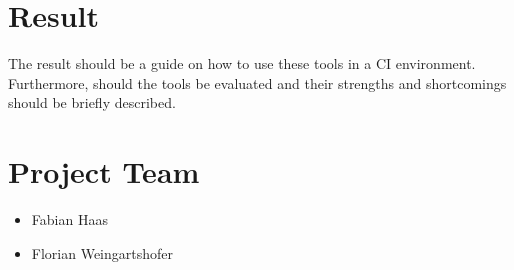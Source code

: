 \documentclass[11pt,journal]{IEEEtran}
\begin{document}
    \section{Result}\label{sec:result}
    The result should be a guide on how to use these tools in a CI environment.
    Furthermore, should the tools be evaluated and their strengths and shortcomings should be briefly described.

    \section{Project Team}\label{sec:project-team}
    \begin{itemize}
        \item Fabian Haas
        \item Florian Weingartshofer
    \end{itemize}
\end{document}
